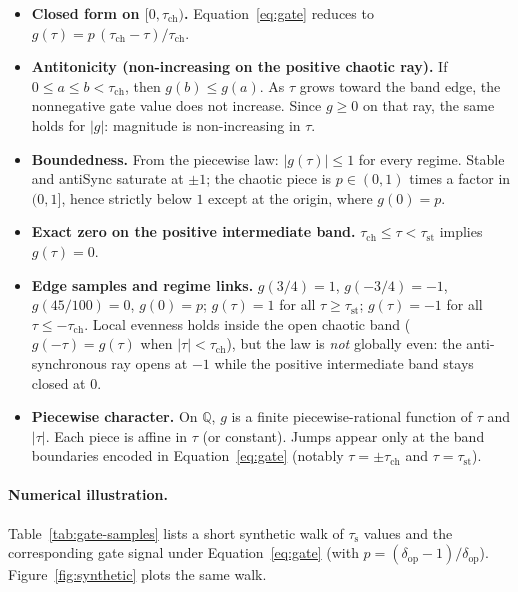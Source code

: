 \documentclass[11pt,a4paper]{article}
\newcommand{\taus}{\tau_{\mathrm{s}}}
\newcommand{\taust}{\tau_{\mathrm{st}}}
\newcommand{\tauch}{\tau_{\mathrm{ch}}}
\newcommand{\deltaop}{\delta_{\mathrm{op}}}
\begin{document}
\begin{itemize}[leftmargin=1.2em]
  \item \textbf{Closed form on \([0,\tauch)\).}
        Equation~\eqref{eq:gate} reduces to
        \(g(\tau)=p\,(\tauch-\tau)/\tauch\).
  \item \textbf{Antitonicity (non-increasing on the positive chaotic ray).}
        If \(0\le a\le b<\tauch\), then \(g(b)\le g(a)\).
        As \(\tau\) grows toward the band edge, the nonnegative gate value does not increase.
        Since \(g\ge 0\) on that ray, the same holds for \(|g|\): magnitude is non-increasing in \(\tau\).
  \item \textbf{Boundedness.}
        From the piecewise law: \(|g(\tau)|\le 1\) for every regime.
        Stable and antiSync saturate at \(\pm 1\);
        the chaotic piece is \(p\in(0,1)\) times a factor in \((0,1]\), hence strictly below \(1\)
        except at the origin, where \(g(0)=p\).
  \item \textbf{Exact zero on the positive intermediate band.}
        \(\tauch\le\tau<\taust\) implies \(g(\tau)=0\).
  \item \textbf{Edge samples and regime links.}
        \(g(3/4)=1\), \(g(-3/4)=-1\), \(g(45/100)=0\), \(g(0)=p\);
        \(g(\tau)=1\) for all \(\tau\ge\taust\);
        \(g(\tau)=-1\) for all \(\tau\le-\tauch\).
        Local evenness holds inside the open chaotic band
        (\(g(-\tau)=g(\tau)\) when \(|\tau|<\tauch\)),
        but the law is \emph{not} globally even: the anti-synchronous ray opens at \(-1\)
        while the positive intermediate band stays closed at \(0\).
  \item \textbf{Piecewise character.}
        On \(\mathbb{Q}\), \(g\) is a finite piecewise-rational function of \(\tau\) and
        \(|\tau|\). Each piece is affine in \(\tau\) (or constant). Jumps appear only at
        the band boundaries encoded in Equation~\eqref{eq:gate}
        (notably \(\tau=\pm\tauch\) and \(\tau=\taust\)).
\end{itemize}

\paragraph{Numerical illustration.}
Table~\ref{tab:gate-samples} lists a short synthetic walk of \(\taus\) values
and the corresponding gate signal under Equation~\eqref{eq:gate}
(with \(p=(\deltaop-1)/\deltaop\)). Figure~\ref{fig:synthetic} plots the same walk.
\end{document}
